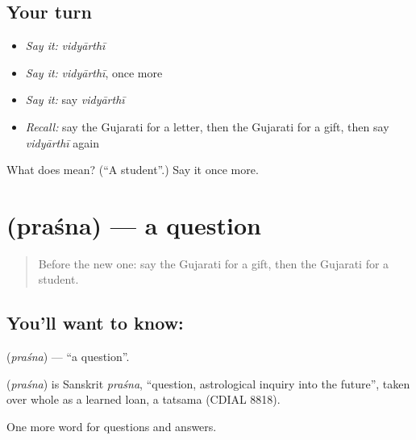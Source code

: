 \subsection*{Your turn}
\begin{itemize}
\raggedright
  \item \emph{Say it:} \emph{vidyārthī}
  \item \emph{Say it:} \emph{vidyārthī}, once more
  \item \emph{Say it:} say \emph{vidyārthī}
  \item \emph{Recall:} say the Gujarati for a letter, then the Gujarati for a gift, then say \emph{vidyārthī} again
\end{itemize}

\begin{tcolorbox}[breakable,colback=teal!4,colframe=teal!35!black,title={Before you move on}]
What does  mean? (\textquotedblleft{}A student\textquotedblright{}.) Say it once more.
\end{tcolorbox}
\section[\texorpdfstring{\gu{પ્રશ્ન} (praśna)}{પ્રશ્ન (praśna)}]{ (praśna) — a question}

\label{lesson:GU-C89-question}



\begin{quote}
Before the new one: say the Gujarati for a gift, then the Gujarati for a student.
\end{quote}

\subsection*{You'll want to know: }
\textbf{} (\emph{praśna}) — \textquotedblleft{}a question\textquotedblright{}.

\begin{cousinweb}
\textbf{} (\emph{praśna}) is Sanskrit \emph{praśna}, \textquotedblleft{}question, astrological inquiry into the future\textquotedblright{}, taken over whole as a learned loan, a tatsama (CDIAL 8818).
\end{cousinweb}

\begin{grammarlens}[title={What you've built}]
One more word for questions and answers.
\end{grammarlens}

